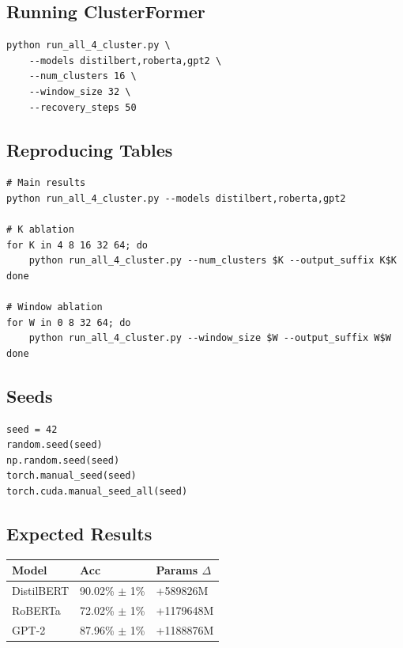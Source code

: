 \subsection{Running ClusterFormer}

\begin{lstlisting}
python run_all_4_cluster.py \
    --models distilbert,roberta,gpt2 \
    --num_clusters 16 \
    --window_size 32 \
    --recovery_steps 50
\end{lstlisting}

\subsection{Reproducing Tables}

\begin{lstlisting}
# Main results
python run_all_4_cluster.py --models distilbert,roberta,gpt2

# K ablation
for K in 4 8 16 32 64; do
    python run_all_4_cluster.py --num_clusters $K --output_suffix K$K
done

# Window ablation
for W in 0 8 32 64; do
    python run_all_4_cluster.py --window_size $W --output_suffix W$W
done
\end{lstlisting}

\subsection{Seeds}

\begin{lstlisting}
seed = 42
random.seed(seed)
np.random.seed(seed)
torch.manual_seed(seed)
torch.cuda.manual_seed_all(seed)
\end{lstlisting}

\subsection{Expected Results}

\begin{table}[H]
\centering
\small
\begin{tabular}{lll}
\toprule
\textbf{Model} & \textbf{Acc} & \textbf{Params $\Delta$} \\
\midrule
DistilBERT & 90.02\% $\pm$ 1\% & +589826M \\
RoBERTa & 72.02\% $\pm$ 1\% & +1179648M \\
GPT-2 & 87.96\% $\pm$ 1\% & +1188876M \\
\bottomrule
\end{tabular}
\end{table}

